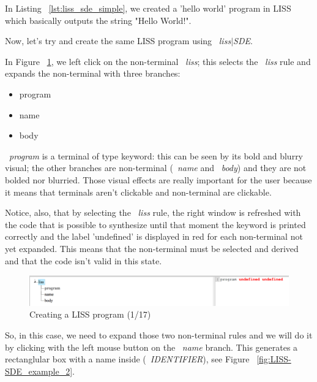 \documentclass[
  oneside,
  11pt, a4paper,
  footinclude=true,
  headinclude=true,
  cleardoublepage=empty
]{scrbook}
\begin{document}
In Listing ~\ref{lst:liss_sde_simple}, we created a 'hello world' program in LISS which basically outputs the string "Hello World!".

Now, let's try and create the same LISS program using ~\textit{liss$|$SDE}.


In Figure ~\ref{fig:LISS-SDE_example_1}, we left click on the non-terminal ~\textit{liss}; this selects the ~\textit{liss} rule and expands the non-terminal with three branches:

\begin{itemize}
\item program
\item name
\item body
\end{itemize}

~\textit{program} is a terminal of type keyword: this can be seen by its bold and blurry visual; the other branches are non-terminal (~\textit{name} and ~\textit{body}) and they are not bolded nor blurried. Those visual effects are really important for the user because it means that terminals aren't clickable and non-terminal are clickable.

Notice, also, that by selecting the ~\textit{liss} rule, the right window is refreshed with the code that is possible to synthesize until that moment the keyword is printed correctly and the label 'undefined' is displayed in red for each non-terminal not yet expanded. This means that the non-terminal must be selected and derived and that the code isn't valid in this state.


\begin{figure}[h!]
  \centering
    \includegraphics[width=1\textwidth]{img/LISS-SDE_creating_program/LISS-SDE1.png}
    \caption{Creating a LISS program (1/17)}
    \label{fig:LISS-SDE_example_1}
\end{figure}

So, in this case, we need to expand those two non-terminal rules and we will do it by clicking with the left mouse button on the ~\textit{name} branch.
This generates a rectanglular box with a name inside (~\textit{IDENTIFIER}), see Figure ~\ref{fig:LISS-SDE_example_2}.
\end{document}

